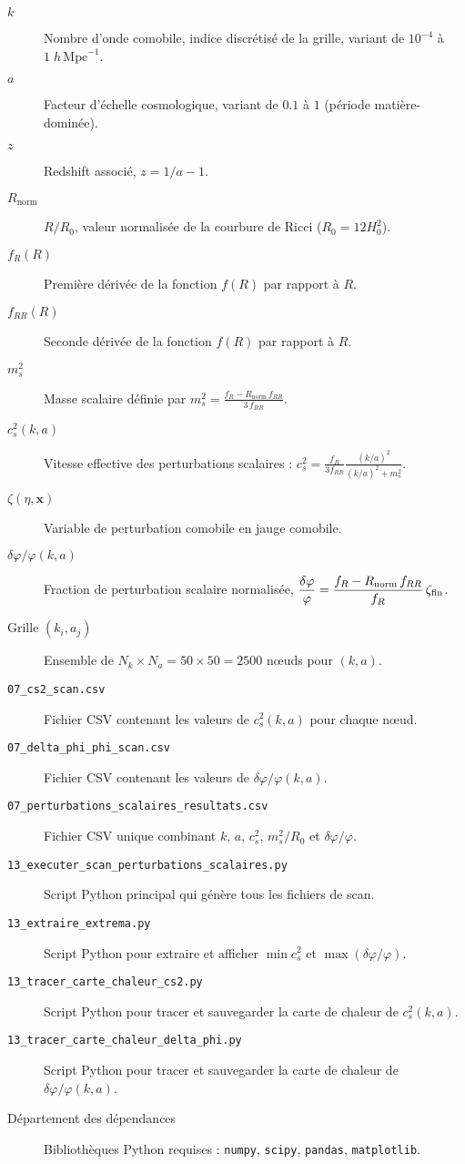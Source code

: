 \begin{description}
  \item[$k$] Nombre d’onde comobile, indice discrétisé de la grille, variant de $10^{-4}$ à $1\;h\,\mathrm{Mpc}^{-1}$.
  \item[$a$] Facteur d’échelle cosmologique, variant de $0.1$ à $1$ (période matière-dominée).
  \item[$z$] Redshift associé, $z = 1/a - 1$.
  \item[$R_{\mathrm{norm}}$] $R/R_{0}$, valeur normalisée de la courbure de Ricci ($R_{0}=12H_{0}^{2}$).
  \item[$f_{R}(R)$] Première dérivée de la fonction $f(R)$ par rapport à $R$.
  \item[$f_{RR}(R)$] Seconde dérivée de la fonction $f(R)$ par rapport à $R$.
  \item[$m_{s}^{2}$] Masse scalaire définie par
    $\displaystyle m_{s}^{2}=\frac{f_{R}-R_{\mathrm{norm}}\,f_{RR}}{3\,f_{RR}}$.
  \item[$c_{s}^{2}(k,a)$] Vitesse effective des perturbations scalaires :
    $\displaystyle c_{s}^{2}=\frac{f_{R}}{3f_{RR}}\frac{(k/a)^{2}}{(k/a)^{2}+m_{s}^{2}}$.
  \item[$\zeta(\eta,\mathbf{x})$] Variable de perturbation comobile en jauge comobile.
  \item[$\delta\varphi/\varphi(k,a)$] Fraction de perturbation scalaire normalisée,
    $\displaystyle \frac{\delta\varphi}{\varphi}=\frac{f_{R}-R_{\mathrm{norm}}\,f_{RR}}{f_{R}}\,\zeta_{\rm fin}$.
  \item[Grille $(k_{i},a_{j})$] Ensemble de $N_{k}\times N_{a}=50\times50=2500$ nœuds pour $(k,a)$.
  \item[\texttt{07\_cs2\_scan.csv}] Fichier CSV contenant les valeurs de $c_{s}^{2}(k,a)$ pour chaque nœud.
  \item[\texttt{07\_delta\_phi\_phi\_scan.csv}] Fichier CSV contenant les valeurs de $\delta\varphi/\varphi(k,a)$.
  \item[\texttt{07\_perturbations\_scalaires\_resultats.csv}] Fichier CSV unique combinant $k$, $a$, $c_{s}^{2}$, $m_{s}^{2}/R_{0}$ et $\delta\varphi/\varphi$.
  \item[\texttt{13\_executer\_scan\_perturbations\_scalaires.py}] Script Python principal qui génère tous les fichiers de scan.
  \item[\texttt{13\_extraire\_extrema.py}] Script Python pour extraire et afficher $\min c_{s}^{2}$ et $\max(\delta\varphi/\varphi)$.
  \item[\texttt{13\_tracer\_carte\_chaleur\_cs2.py}] Script Python pour tracer et sauvegarder la carte de chaleur de $c_{s}^{2}(k,a)$.
  \item[\texttt{13\_tracer\_carte\_chaleur\_delta\_phi.py}] Script Python pour tracer et sauvegarder la carte de chaleur de $\delta\varphi/\varphi(k,a)$.
  \item[Département des dépendances]
    Bibliothèques Python requises : \texttt{numpy}, \texttt{scipy}, \texttt{pandas}, \texttt{matplotlib}.
\end{description}


